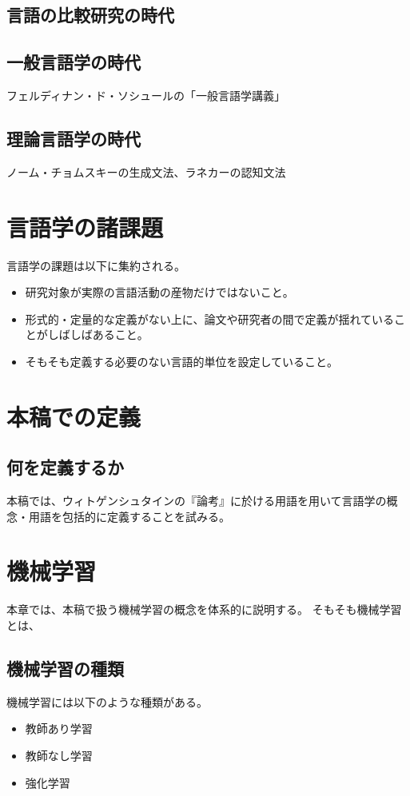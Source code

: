 \documentclass[12pt, oneside]{book} %
\begin{document}
\chapter{言語の比較研究の時代}
\chapter{一般言語学の時代}
フェルディナン・ド・ソシュールの「一般言語学講義」
\chapter{理論言語学の時代}
ノーム・チョムスキーの生成文法、ラネカーの認知文法

\part{言語学の諸課題}
言語学の課題は以下に集約される。
\begin{itemize}
    \item 研究対象が実際の言語活動の産物だけではないこと。
    \item 形式的・定量的な定義がない上に、論文や研究者の間で定義が揺れていることがしばしばあること。
    \item そもそも定義する必要のない言語的単位を設定していること。
\end{itemize}
\part{本稿での定義}
\chapter{何を定義するか}
本稿では、ウィトゲンシュタインの『論考』に於ける用語を用いて言語学の概念・用語を包括的に定義することを試みる。
\chapter{}
\part{機械学習}
本章では、本稿で扱う機械学習の概念を体系的に説明する。
そもそも機械学習とは、
\chapter{機械学習の種類}
機械学習には以下のような種類がある。
\begin{itemize}
    \item 教師あり学習
    \item 教師なし学習
    \item 強化学習
\end{itemize}
\end{document}
